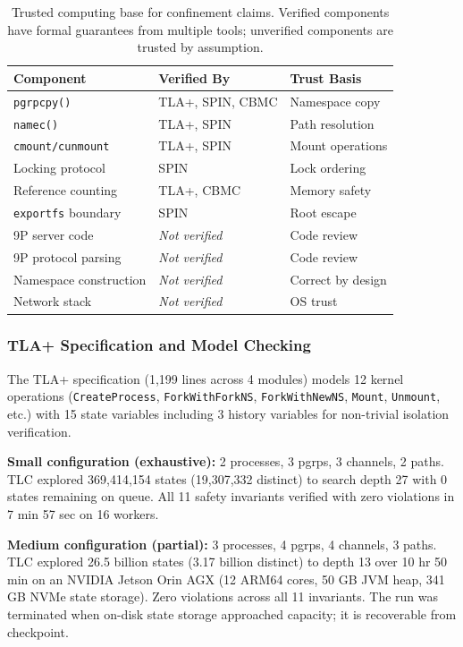 \documentclass{article}
\begin{document}
\begin{table}[h]
\centering
\small
\begin{tabular}{p{2.2cm}p{2.8cm}p{2.5cm}}
\hline
\textbf{Component} & \textbf{Verified By} & \textbf{Trust Basis} \\
\hline
\texttt{pgrpcpy()} & TLA+, SPIN, CBMC & Namespace copy \\
\texttt{namec()} & TLA+, SPIN & Path resolution \\
\texttt{cmount/cunmount} & TLA+, SPIN & Mount operations \\
Locking protocol & SPIN & Lock ordering \\
Reference counting & TLA+, CBMC & Memory safety \\
\texttt{exportfs} boundary & SPIN & Root escape \\
\hline
9P server code & \textit{Not verified} & Code review \\
9P protocol parsing & \textit{Not verified} & Code review \\
Namespace construction & \textit{Not verified} & Correct by design \\
Network stack & \textit{Not verified} & OS trust \\
\hline
\end{tabular}
\caption{Trusted computing base for confinement claims. Verified components have
formal guarantees from multiple tools; unverified components are trusted by assumption.}
\label{tab:tcb-verification}
\end{table}

\subsubsection{TLA+ Specification and Model Checking}

The TLA+ specification (1,199 lines across 4 modules) models 12 kernel operations
(\texttt{CreateProcess}, \texttt{ForkWithForkNS}, \texttt{ForkWithNewNS}, \texttt{Mount},
\texttt{Unmount}, etc.) with 15 state variables including 3 history variables for
non-trivial isolation verification.

\textbf{Small configuration (exhaustive):} 2 processes, 3 pgrps, 3 channels, 2 paths.
TLC explored 369,414,154 states (19,307,332 distinct) to search depth 27 with 0 states
remaining on queue. All 11 safety invariants verified with zero violations in 7 min
57 sec on 16 workers.

\textbf{Medium configuration (partial):} 3 processes, 4 pgrps, 4 channels, 3 paths.
TLC explored 26.5 billion states (3.17 billion distinct) to depth 13 over 10 hr
50 min on an NVIDIA Jetson Orin AGX (12 ARM64 cores, 50 GB JVM heap, 341 GB NVMe state
storage). Zero violations across all 11 invariants. The run was terminated when
on-disk state storage approached capacity; it is recoverable from checkpoint.
\end{document}
